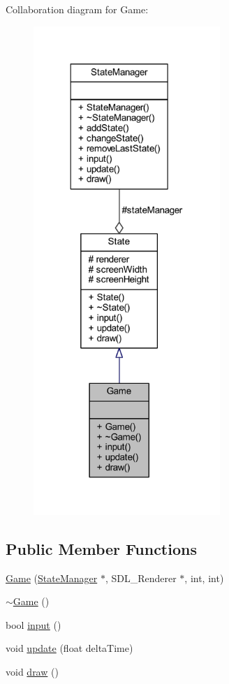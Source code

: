 Collaboration diagram for Game\+:\nopagebreak
\begin{figure}[H]
\begin{center}
\leavevmode
\includegraphics[width=200pt]{class_game__coll__graph}
\end{center}
\end{figure}
\subsection*{Public Member Functions}
\begin{DoxyCompactItemize}
\item 
\hyperlink{class_game_a152727bb1c8f9af5cf824cd4ddbb055b}{Game} (\hyperlink{class_state_manager}{State\+Manager} $\ast$, S\+D\+L\+\_\+\+Renderer $\ast$, int, int)
\item 
\hyperlink{class_game_ae3d112ca6e0e55150d2fdbc704474530}{$\sim$\+Game} ()
\item 
bool \hyperlink{class_game_a6e3ee4ac1c5ee591527cd13cfb4cfab2}{input} ()
\item 
void \hyperlink{class_game_a419466336fad97182f5051e11f541636}{update} (float delta\+Time)
\item 
void \hyperlink{class_game_a6d54497ce3a66f6dd45eacfdccc8d0bd}{draw} ()
\end{DoxyCompactItemize}
